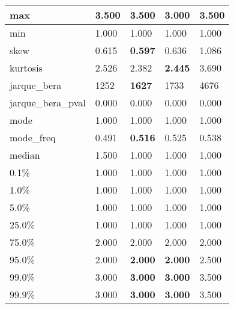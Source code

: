 \begin{table}[H]
\begin{tabular}{|l|m{10em}|m{10em}|m{10em}|m{10em}|}
\hline max & 3.500 & \bfseries 3.500 & \cellcolor[rgb]{0.9, 0.54, 0.52} 3.000 & \bfseries 3.500 \\
\hline min & 1.000 & 1.000 & 1.000 & 1.000 \\
\hline skew & 0.615 & \bfseries 0.597 & 0.636 & \cellcolor[rgb]{0.9, 0.54, 0.52} 1.086 \\
\hline kurtosis & 2.526 & 2.382 & \bfseries 2.445 & \cellcolor[rgb]{0.9, 0.54, 0.52} 3.690 \\
\hline jarque\_bera & 1252 & \bfseries 1627 & 1733 & \cellcolor[rgb]{0.9, 0.54, 0.52} 4676 \\
\hline jarque\_bera\_pval & 0.000 & 0.000 & 0.000 & 0.000 \\
\hline mode & 1.000 & 1.000 & 1.000 & 1.000 \\
\hline mode\_freq & 0.491 & \bfseries 0.516 & 0.525 & \cellcolor[rgb]{0.9, 0.54, 0.52} 0.538 \\
\hline median & 1.500 & 1.000 & 1.000 & 1.000 \\
\hline 0.1\% & 1.000 & 1.000 & 1.000 & 1.000 \\
\hline 1.0\% & 1.000 & 1.000 & 1.000 & 1.000 \\
\hline 5.0\% & 1.000 & 1.000 & 1.000 & 1.000 \\
\hline 25.0\% & 1.000 & 1.000 & 1.000 & 1.000 \\
\hline 75.0\% & 2.000 & 2.000 & 2.000 & 2.000 \\
\hline 95.0\% & 2.000 & \bfseries 2.000 & \bfseries 2.000 & \cellcolor[rgb]{0.9, 0.54, 0.52} 2.500 \\
\hline 99.0\% & 3.000 & \bfseries 3.000 & \bfseries 3.000 & \cellcolor[rgb]{0.9, 0.54, 0.52} 3.500 \\
\hline 99.9\% & 3.000 & \bfseries 3.000 & \bfseries 3.000 & \cellcolor[rgb]{0.9, 0.54, 0.52} 3.500 \\
\hline
\end{tabular}
\end{table}
